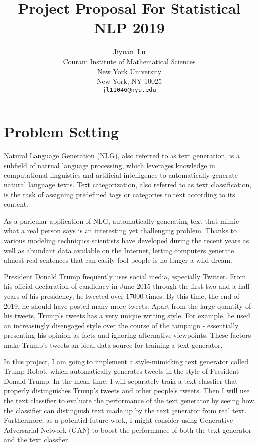 \documentclass{article}
\title{Project Proposal For Statistical NLP 2019}
\author{%
  Jiyuan~Lu\\
  Courant Institute of Mathematical Sciences\\
  New York University\\
  New York, NY 10025 \\
  \texttt{jl11046@nyu.edu} \\
}
\begin{document}
\maketitle

\section{Problem Setting}
Natural Language Generation (NLG), also referred to as text generation, is a subfield of natrual language processing, which leverages knowledge in computational linguistics and artificial intelligence to automatically generate natural language texts. Text categorization, also referred to as text classification, is the task of assigning predefined tags or categories to text according to its content. 

As a paricular application of NLG, automatically generating text that mimic what a real person says is an interesting yet challenging problem. Thanks to various modeling techniques scientists have developed during the recent years as well as abundant data available on the Internet, letting computers generate almost-real sentences that can easily fool people is no longer a wild dream.

President Donald Trump frequently uses social media, especially Twitter. From his offcial declaration of candidacy in June 2015 through the first two-and-a-half years of his presidency, he tweeted over 17000 times. By this time, the end of 2019, he should have posted many more tweets. Apart from the large quantity of his tweets, Trump's tweets has a very unique writing style. For example, he used an increasingly disengaged style over the course of the campaign - essentially presenting his opinion as facts and ignoring alternative viewpoints. These factors make Trump's tweets an ideal data source for training a text generator.

In this project, I am going to implement a style-mimicking text generator called Trump-Robot, which automatically generates tweets in the style of President Donald Trump. In the mean time, I will separately train a text classfier that properly distinguishes Trump's tweets and other people's tweets. Then I will use the text classifier to evaluate the performance of the text generator by seeing how the classifier can distinguish text made up by the text generator from real text. Furthermore, as a potential future work, I might consider using Generative Adversarial Network (GAN) to boost the performance of both the text generator and the text classfier.
\end{document}
